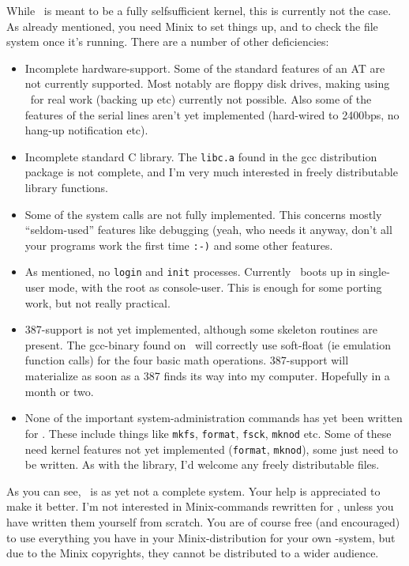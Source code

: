 While \Linux\ is meant to be a fully selfsufficient kernel, this is
currently not the case. As already mentioned, you need Minix to set
things up, and to check the file system once it's running. There are a
number of other deficiencies:
\begin{itemize}
%
\item Incomplete hardware-support. Some of the standard features of an
AT are not currently supported. Most notably are floppy disk drives,
making using \Linux\ for real work (backing up etc) currently not
possible. Also some of the features of the serial lines aren't yet
implemented (hard-wired to 2400bps, no hang-up notification etc).
%
\item Incomplete standard C library. The {\tt libc.a} found in the gcc
distribution package is not complete, and I'm very much interested in
freely distributable library functions.
%
\item Some of the system calls are not fully implemented.  This concerns
mostly ``seldom-used'' features like debugging (yeah, who needs it
anyway, don't all your programs work the first time {\tt:-)} and some
other features. 
%
\item As mentioned, no {\tt login} and {\tt init} processes. Currently
\Linux\ boots up in single-user mode, with the root as console-user.
This is enough for some porting work, but not really practical.
%
\item 387-support is not yet implemented, although some skeleton
routines are present. The gcc-binary found on \nic\ will correctly use
soft-float (ie emulation function calls) for the four basic math
operations. 387-support will materialize as soon as a 387 finds its way
into my computer. Hopefully in a month or two.
%
\item None of the important system-administration commands has yet been
written for \Linux. These include things like {\tt mkfs}, {\tt format},
{\tt fsck}, {\tt mknod} etc. Some of these need kernel features not yet
implemented ({\tt format}, {\tt mknod}), some just need to be written.
As with the library, I'd welcome any freely distributable files.
%
\end{itemize}

As you can see, \Linux\ is as yet not a complete system.  Your help is
appreciated to make it better.  I'm not interested in Minix-commands
rewritten for \Linux, unless you have written them yourself from
scratch.  You are of course free (and encouraged) to use everything you
have in your Minix-distribution for your own \Linux-system, but due to
the Minix copyrights, they cannot be distributed to a wider audience.


